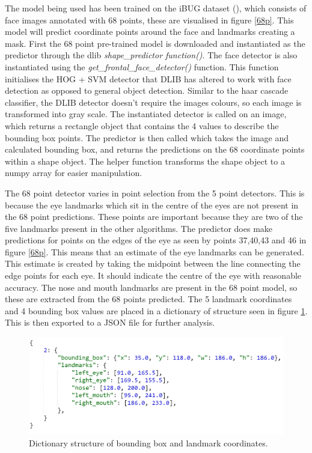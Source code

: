 \documentclass{l4proj}
\begin{document}
The model being used has been trained on the iBUG dataset (\cite{300w}), which consists of face images annotated with 68 points, these are visualised in figure \ref{68p}. This model will predict coordinate points around the face and landmarks creating a mask. First the 68 point pre-trained model is downloaded and instantiated as the predictor through the dlib \textit{shape\_predictor function()}. The face detector is also instantiated using the \textit{get\_frontal\_face\_detector()} function. This function initialises the HOG + SVM detector that DLIB has altered to work with face detection as opposed to general object detection. Similar to the haar cascade classifier, the DLIB detector doesn't require the images colours, so each image is transformed into gray scale. The instantiated detector is called on an image, which returns a rectangle object that contains the 4 values to describe the bounding box points. The predictor is then called which takes the image and calculated bounding box, and returns the predictions on the 68 coordinate points within a shape object. The helper function transforms the shape object to a numpy array for easier manipulation.

The 68 point detector varies in point selection from the 5 point detectors. This is because the eye landmarks which sit in the centre of the eyes are not present in the 68 point predictions. These points are important because they are two of the five landmarks present in the other algorithms. The predictor does make predictions for points on the edges of the eye as seen by points 37,40,43 and 46 in figure \ref{68p}. This means that an estimate of the eye landmarks can be generated. This estimate is created by taking the midpoint between the line connecting the edge points for each eye. It should indicate the centre of the eye with reasonable accuracy. The nose and mouth landmarks are present in the 68 point model, so these are extracted from the 68 points predicted. The 5 landmark coordinates and 4 bounding box values are placed in a dictionary of structure seen in figure \ref{dict}. This is then exported to a JSON file for further analysis.

\begin{figure}[h!]
  \centering
  \begin{minipage}{0.8\textwidth}
    \includegraphics[width=\textwidth]{images/dictionary_structure.PNG}
    \caption{Dictionary structure of bounding box and landmark coordinates.}
    \label{dict}
  \end{minipage}
  \hfill
\end{figure}
\end{document}
